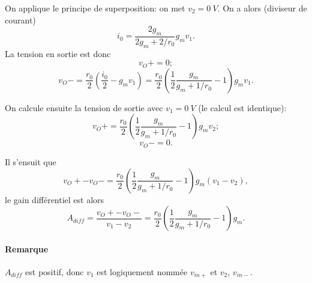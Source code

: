 \documentclass[frenchb,DIV=14]{scrartcl}
\begin{document}
On applique le principe de superposition: on met $v_2 = \SI{0}{V}$.
On a alors (diviseur de courant)
\[i_0 = \frac{2g_m}{2g_m + 2/r_0}g_m v_1.\]
La tension en sortie est donc
\[v_O+ = 0;\]
\[v_O- = \frac{r_0}{2}\left(\frac{i_0}{2} - g_m v_1\right)
= \frac{r_0}{2}\left(\frac{1}{2}\frac{g_m}{g_m+1/r_0} - 1\right)g_m v_1.\]

On calcule ensuite la tension de sortie avec $v_1 = \SI{0}{V}$ (le calcul est identique):
\[v_O+ = \frac{r_0}{2}\left(\frac{1}{2}\frac{g_m}{g_m+1/r_0} - 1\right)g_m v_2;\]
\[v_O- = 0.\]

Il s'ensuit que
\[v_O+ - v_O- = \frac{r_0}{2}\left(\frac{1}{2}\frac{g_m}{g_m+1/r_0}-1\right)g_m(v_1-v_2),\]
le gain différentiel est alors
\[A_{diff} =
\frac{v_O+ - v_O-}{v_1-v_2} = \frac{r_0}{2}\left(\frac{1}{2}\frac{g_m}{g_m+1/r_0}-1\right)g_m.\]

\paragraph{Remarque} $A_{diff}$ est positif, donc $v_1$ est logiquement nommée $v_{in+}$ et
$v_2$, $v_{in-}$.
\end{document}
